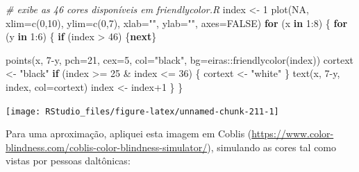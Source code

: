 \documentclass[
]{article}
\newenvironment{Shaded}{\begin{snugshade}}{\end{snugshade}}
\newcommand{\AttributeTok}[1]{\textcolor[rgb]{0.77,0.63,0.00}{#1}}
\newcommand{\CommentTok}[1]{\textcolor[rgb]{0.56,0.35,0.01}{\textit{#1}}}
\newcommand{\ConstantTok}[1]{\textcolor[rgb]{0.00,0.00,0.00}{#1}}
\newcommand{\ControlFlowTok}[1]{\textcolor[rgb]{0.13,0.29,0.53}{\textbf{#1}}}
\newcommand{\DecValTok}[1]{\textcolor[rgb]{0.00,0.00,0.81}{#1}}
\newcommand{\FunctionTok}[1]{\textcolor[rgb]{0.00,0.00,0.00}{#1}}
\newcommand{\NormalTok}[1]{#1}
\newcommand{\OtherTok}[1]{\textcolor[rgb]{0.56,0.35,0.01}{#1}}
\newcommand{\SpecialCharTok}[1]{\textcolor[rgb]{0.00,0.00,0.00}{#1}}
\newcommand{\StringTok}[1]{\textcolor[rgb]{0.31,0.60,0.02}{#1}}
\begin{document}
\begin{Shaded}
\begin{Highlighting}[]
\CommentTok{\# exibe as 46 cores disponíveis em friendlycolor.R}
\NormalTok{index }\OtherTok{\textless{}{-}} \DecValTok{1}
\FunctionTok{plot}\NormalTok{(}\ConstantTok{NA}\NormalTok{, }\AttributeTok{xlim=}\FunctionTok{c}\NormalTok{(}\DecValTok{0}\NormalTok{,}\DecValTok{10}\NormalTok{), }\AttributeTok{ylim=}\FunctionTok{c}\NormalTok{(}\DecValTok{0}\NormalTok{,}\DecValTok{7}\NormalTok{), }
     \AttributeTok{xlab=}\StringTok{""}\NormalTok{, }\AttributeTok{ylab=}\StringTok{""}\NormalTok{, }\AttributeTok{axes=}\ConstantTok{FALSE}\NormalTok{)}
\ControlFlowTok{for}\NormalTok{ (x }\ControlFlowTok{in} \DecValTok{1}\SpecialCharTok{:}\DecValTok{8}\NormalTok{)}
\NormalTok{\{}
  \ControlFlowTok{for}\NormalTok{ (y }\ControlFlowTok{in} \DecValTok{1}\SpecialCharTok{:}\DecValTok{6}\NormalTok{)}
\NormalTok{  \{}
    \ControlFlowTok{if}\NormalTok{ (index }\SpecialCharTok{\textgreater{}} \DecValTok{46}\NormalTok{) \{}\ControlFlowTok{next}\NormalTok{\}}

    \FunctionTok{points}\NormalTok{(x, }\DecValTok{7}\SpecialCharTok{{-}}\NormalTok{y, }\AttributeTok{pch=}\DecValTok{21}\NormalTok{, }\AttributeTok{cex=}\DecValTok{5}\NormalTok{, }\AttributeTok{col=}\StringTok{"black"}\NormalTok{, }\AttributeTok{bg=}\NormalTok{eiras}\SpecialCharTok{::}\FunctionTok{friendlycolor}\NormalTok{(index))}
\NormalTok{    cortext }\OtherTok{\textless{}{-}} \StringTok{"black"}
    \ControlFlowTok{if}\NormalTok{ (index }\SpecialCharTok{\textgreater{}=} \DecValTok{25} \SpecialCharTok{\&}\NormalTok{ index }\SpecialCharTok{\textless{}=} \DecValTok{36}\NormalTok{)}
\NormalTok{    \{}
\NormalTok{      cortext }\OtherTok{\textless{}{-}} \StringTok{"white"}
\NormalTok{    \}}
    \FunctionTok{text}\NormalTok{(x, }\DecValTok{7}\SpecialCharTok{{-}}\NormalTok{y, index, }\AttributeTok{col=}\NormalTok{cortext)}
\NormalTok{    index }\OtherTok{\textless{}{-}}\NormalTok{ index}\SpecialCharTok{+}\DecValTok{1}
\NormalTok{  \}}
\NormalTok{\}}
\end{Highlighting}
\end{Shaded}

\begin{center}\texttt{[image: RStudio\_files/figure-latex/unnamed-chunk-211-1]} \end{center}

Para uma aproximação, apliquei esta imagem em Coblis
(\url{https://www.color-blindness.com/coblis-color-blindness-simulator/}),
simulando as cores tal como vistas por pessoas daltônicas:
\end{document}
